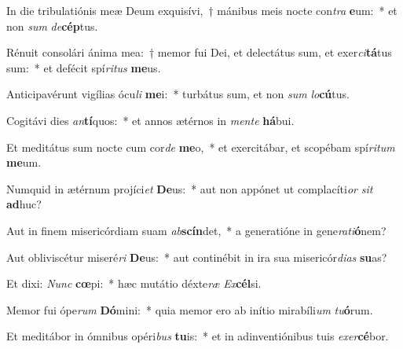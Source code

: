 \item In die tribulatiónis meæ Deum exquisívi,~† mánibus meis nocte con\textit{tra} \textbf{e}um:~* et non \textit{sum} \textit{de}\textbf{cép}tus.
\item Rénuit consolári ánima mea:~† memor fui Dei, et delectátus sum, et exer\textit{ci}\textbf{tá}tus sum:~* et defécit spí\textit{ri}\textit{tus} \textbf{me}us.
\item Anticipavérunt vigílias ócu\textit{li} \textbf{me}i:~* turbátus sum, et non \textit{sum} \textit{lo}\textbf{cú}tus.
\item Cogitávi dies \textit{an}\textbf{tí}quos:~* et annos ætérnos in \textit{men}\textit{te} \textbf{há}bui.
\item Et meditátus sum nocte cum cor\textit{de} \textbf{me}o,~* et exercitábar, et scopébam spí\textit{ri}\textit{tum} \textbf{me}um.
\item Numquid in ætérnum projíci\textit{et} \textbf{De}us:~* aut non appónet ut complacíti\textit{or} \textit{sit} \textbf{ad}huc?
\item Aut in finem misericórdiam suam \textit{ab}\textbf{scín}det,~* a generatióne in gene\textit{ra}\textit{ti}\textbf{ó}nem?
\item Aut obliviscétur miseré\textit{ri} \textbf{De}us:~* aut continébit in ira sua misericór\textit{di}\textit{as} \textbf{su}as?
\item Et dixi: \textit{Nunc} \textbf{cœ}pi:~* hæc mutátio déxte\textit{ræ} \textit{Ex}\textbf{cél}si.
\item Memor fui ópe\textit{rum} \textbf{Dó}mini:~* quia memor ero ab inítio mirabíli\textit{um} \textit{tu}\textbf{ó}rum.
\item Et meditábor in ómnibus opéri\textit{bus} \textbf{tu}is:~* et in adinventiónibus tuis \textit{ex}\textit{er}\textbf{cé}bor.
